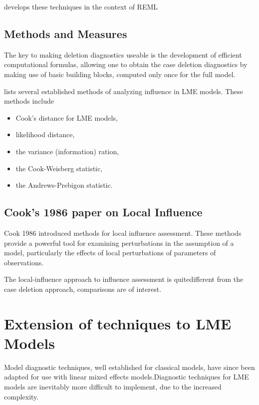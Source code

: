 \documentclass[Main.tex]{subfiles}
\begin{document}
\citet{Christiansen} develops these techniques in the context of REML

\subsection{Methods and Measures}
The key to making deletion diagnostics useable is the development of efficient computational formulas, allowing one to obtain the  case deletion diagnostics by making use of basic building blocks, computed only once for the full model.

\citet{Zewotir} lists several established methods of analyzing influence in LME models. These methods include \begin{itemize}
	\item Cook's distance for LME models,
	\item {} likelihood distance,
	\item the variance (information) ration,
	\item the  Cook-Weisberg statistic,
	\item the  Andrews-Prebigon statistic.
\end{itemize}



\subsection{Cook's 1986 paper on Local Influence}%
Cook 1986 introduced methods for local influence assessment. These methods provide a powerful tool for examining perturbations in the assumption of a model, particularly the effects of local perturbations of parameters of observations.

The local-influence approach to influence assessment is quitedifferent from the case deletion approach, comparisons are of
interest.



\newpage
\section{Extension of techniques to LME Models} %

Model diagnostic techniques, well established for classical models, have since been adapted for use with linear mixed effects models.Diagnostic techniques for LME models are inevitably more difficult to implement, due to the increased complexity.
\end{document}
